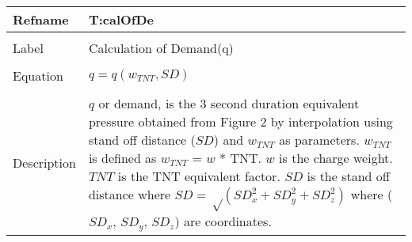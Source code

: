 \documentclass[12pt]{article}
\begin{document}
~\newline
\noindent \begin{minipage}{\textwidth}
\begin{tabular}{p{} p{}}
\toprule \textbf{Refname} & \textbf{T:calOfDe}
\label{T:calOfDe}
\\ \midrule \\
Label & Calculation of Demand(q)
\\ \midrule \\
Equation & $q=q\left(w_{TNT},SD\right)$
\\ \midrule \\
Description & $q$ or demand, is the 3 second duration equivalent pressure obtained from Figure 2 by interpolation using stand off distance ($SD$) and $w_{TNT}$ as parameters. $w_{TNT}$ is defined as $w_{TNT}$ = $w$ * TNT. $w$ is the charge weight. $TNT$ is the TNT equivalent factor. $SD$ is the stand off distance where $SD=\sqrt\left(SD_{x}^{2}+SD_{y}^{2}+SD_{z}^{2}\right)$ where ($SD_{x}$, $SD_{y}$, $SD_{z}$) are coordinates.
\\ \bottomrule \end{tabular}
\end{minipage}\\
\end{document}
